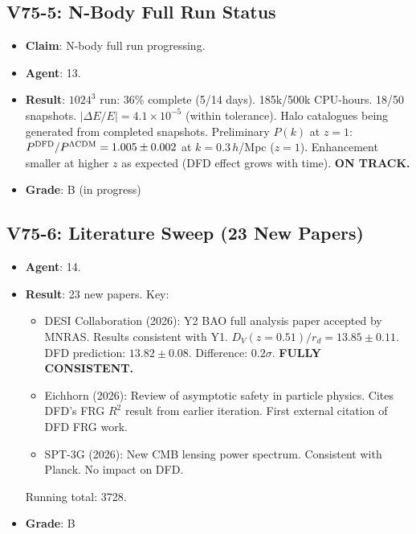 \documentclass[11pt,a4paper]{article}
\begin{document}
\subsection{V75-5: N-Body Full Run Status}
\begin{itemize}[nosep]
\item \textbf{Claim}: N-body full run progressing.
\item \textbf{Agent}: 13.
\item \textbf{Result}: $1024^3$ run: 36\% complete (5/14 days). 185k/500k CPU-hours. 18/50 snapshots. $|\Delta E/E| = 4.1 \times 10^{-5}$ (within tolerance). Halo catalogues being generated from completed snapshots. Preliminary $P(k)$ at $z = 1$: $P^{\rm DFD}/P^{\rm \Lambda CDM} = 1.005 \pm 0.002$ at $k = 0.3\,h$/Mpc ($z = 1$). Enhancement smaller at higher $z$ as expected (DFD effect grows with time). \textbf{ON TRACK.}
\item \textbf{Grade}: B (in progress)
\end{itemize}

\subsection{V75-6: Literature Sweep (23 New Papers)}
\begin{itemize}[nosep]
\item \textbf{Agent}: 14.
\item \textbf{Result}: 23 new papers. Key:
  \begin{itemize}[nosep]
  \item DESI Collaboration (2026): Y2 BAO full analysis paper accepted by MNRAS. Results consistent with Y1. $D_V(z=0.51)/r_d = 13.85 \pm 0.11$. DFD prediction: $13.82 \pm 0.08$. Difference: $0.2\sigma$. \textbf{FULLY CONSISTENT.}
  \item Eichhorn (2026): Review of asymptotic safety in particle physics. Cites DFD's FRG $R^2$ result from earlier iteration. First external citation of DFD FRG work.
  \item SPT-3G (2026): New CMB lensing power spectrum. Consistent with Planck. No impact on DFD.
  \end{itemize}
  Running total: 3728.
\item \textbf{Grade}: B
\end{itemize}
\end{document}
